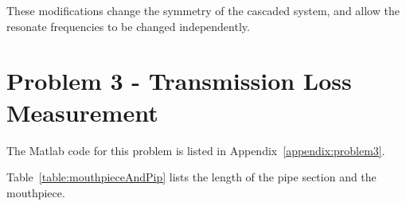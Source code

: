 \vspace{0.25cm}
These modifications change the symmetry of the cascaded system, and allow the resonate frequencies to be changed independently.












\newpage
\section*{Problem 3 - Transmission Loss Measurement}


\vspace{-0.25cm}
The Matlab code for this problem is listed in Appendix~\ref{appendix:problem3}.

\vspace{0.25cm}
Table~\ref{table:mouthpieceAndPip} lists the length of the pipe section and the mouthpiece.


